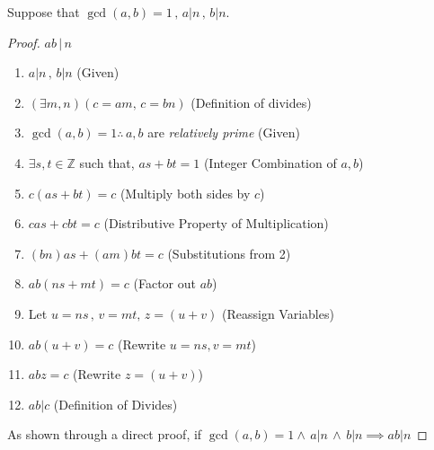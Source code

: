 \documentclass[12pt]{article}
\newcommand{\Z}{\mathbb{Z}}
\newenvironment{question}[2][Question]{\begin{trivlist}
\item[\hskip \labelsep {\bfseries #1}\hskip \labelsep {\bfseries #2.}]}{\end{trivlist}}
\newenvironment{level}%
{\addtolength{\itemindent}{2em}}%
{\addtolength{\itemindent}{-2em}}
\begin{document}
\begin{question}{6.28} Suppose that $\gcd(a,b)=1\, , \, a|n\, ,\, b|n$.
\end{question}\leavevmode
\begin{proof}$ab\,|\,n$
    \begin{enumerate}
    \item $a|n\, ,\, b|n$ \hfill(Given)
    \begin{level}
    	\item $(\exists m,n) (c=am,\, c=bn)$ \hfill(Definition of divides)
	\end{level}    
    \item $\gcd(a,b)=1 \therefore \, a,b$ are \textit{relatively prime} \hfill(Given)
    \begin{level}
    	\item $\exists s,t \in \Z$ such that,  $as+bt=1$ \hfill(Integer Combination of $a,b$)
    	\item $c(as+bt)=c$ \hfill(Multiply both sides by $c$)
    	\item $cas+cbt=c$ \hfill(Distributive Property of Multiplication)
    	\item $(bn)as+(am)bt=c$ \hfill(Substitutions from 2)
    	\item $ab(ns+mt)=c$ \hfill(Factor out $ab$)
    \end{level} 
    \item Let $u=ns \, , \, v = mt, \, z = (u+v)$ \hfill(Reassign Variables)
	\begin{level}
		\item $ab(u+v) = c$  \hfill(Rewrite $u=ns,v=mt$)
		\item $abz = c$ \hfill(Rewrite $z =(u+v)$)
		\item $ab|c$ \hfill(Definition of Divides)
 	\end{level}  
	\end{enumerate}
As shown through a direct proof, if $ \gcd(a,b)=1 \wedge \, a|n \,\land\, b|n \implies ab|n$
\end{proof}
\end{document}
